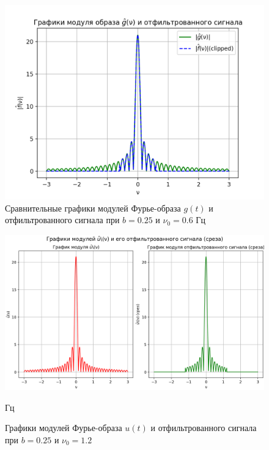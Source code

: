 \begin{figure}[ht!]
    \centering
    \includegraphics[scale=0.55]{media/1 task/high_freq/Fourier_Image_Comparison_0,25_-0,5975975975975976.png}
    \caption{Сравнительные графики модулей Фурье-образа $g(t)$ и отфильтрованного сигнала при $b=0.25$ и $\nu_0=0.6$ Гц}
    \label{fig:fourc_025_06}
\end{figure}

\begin{figure}[ht!]
    \centering
    \includegraphics[scale=0.55]{media/1 task/high_freq/Fourier_Image_0,25_-1,1981981981981982.png}
    \caption{Графики модулей Фурье-образа $u(t)$ и отфильтрованного сигнала при $b=0.25$ и $\nu_0=1.2$} Гц
    \label{fig:four_025_12}
\end{figure}

